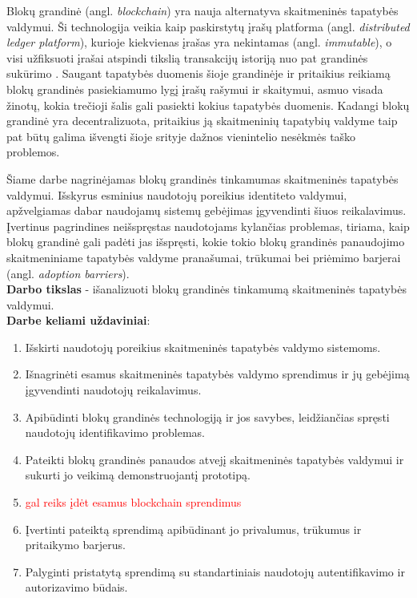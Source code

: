 Blokų grandinė (angl. \textit{blockchain}) yra nauja alternatyva skaitmeninės tapatybės valdymui. Ši technologija veikia kaip
paskirstytų įrašų platforma (angl. \textit{distributed ledger platform}), kurioje kiekvienas įrašas yra nekintamas (angl. \textit{immutable}), o visi
užfiksuoti įrašai atspindi tikslią transakcijų istoriją nuo pat grandinės sukūrimo \cite{Baars2016}. Saugant tapatybės duomenis šioje grandinėje ir
pritaikius reikiamą blokų grandinės pasiekiamumo lygį įrašų rašymui ir skaitymui, asmuo visada
žinotų, kokia trečioji šalis gali pasiekti kokius tapatybės duomenis. Kadangi blokų grandinė yra decentralizuota, pritaikius ją skaitmeninių tapatybių valdyme taip pat
būtų galima išvengti šioje srityje dažnos vienintelio nesėkmės taško problemos. 

Šiame darbe nagrinėjamas blokų grandinės tinkamumas skaitmeninės tapatybės valdymui. Išskyrus esminius naudotojų poreikius identiteto valdymui,
apžvelgiamas dabar naudojamų sistemų gebėjimas įgyvendinti šiuos reikalavimus. Įvertinus pagrindines neišspręstas naudotojams kylančias problemas,
tiriama, kaip blokų grandinė gali padėti jas išspręsti, kokie tokio blokų grandinės panaudojimo skaitmeniniame tapatybės valdyme
pranašumai, trūkumai bei priėmimo barjerai (angl. \textit{adoption barriers}).
\\

\textbf{Darbo tikslas} - išanalizuoti blokų grandinės tinkamumą skaitmeninės tapatybės valdymui.
\\

\textbf{Darbe keliami uždaviniai}:

\begin{enumerate}
    \item Išskirti naudotojų poreikius skaitmeninės tapatybės valdymo sistemoms.
    \item Išnagrinėti esamus skaitmeninės tapatybės valdymo sprendimus ir jų gebėjimą
    įgyvendinti naudotojų reikalavimus.
    \item Apibūdinti blokų grandinės technologiją ir jos savybes, leidžiančias spręsti naudotojų identifikavimo problemas.
    \item Pateikti blokų grandinės panaudos atvejį skaitmeninės tapatybės valdymui ir sukurti jo veikimą demonstruojantį prototipą.
    \item \textcolor{red}{gal reiks įdėt esamus blockchain sprendimus}
    \item Įvertinti pateiktą sprendimą apibūdinant jo privalumus, trūkumus ir pritaikymo barjerus.
    \item Palyginti pristatytą sprendimą su standartiniais naudotojų autentifikavimo ir autorizavimo būdais.
\end{enumerate}
